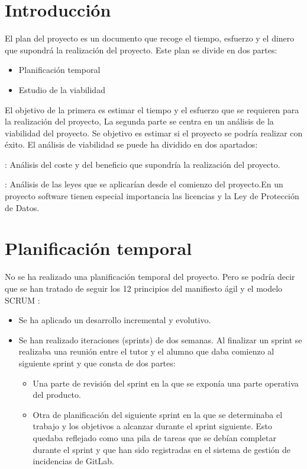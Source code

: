 
\section{Introducción}
El plan del proyecto es un documento que recoge el tiempo, esfuerzo y el dinero que supondrá la realización del proyecto.
Este plan se divide en dos partes:
\begin{itemize}
	\tightlist
	\item Planificación temporal
	\item Estudio de la viabilidad
\end{itemize}
El objetivo de la primera es estimar el tiempo y el esfuerzo que se requieren para la realización del proyecto, 
La segunda parte se centra en un análisis de la viabilidad del proyecto. Se objetivo es estimar si el proyecto se podría realizar con éxito. El análisis de viabilidad se puede ha dividido en dos apartados:
\begin{description}
	\tightlist
	\item[Viabilidad económica]: Análisis del coste y del beneficio que supondría la realización del proyecto.
	\item[Viabilidad legal]: Análisis de las leyes que se aplicarían desde el comienzo del proyecto.En un proyecto software tienen especial importancia las licencias y la Ley
	de Protección de Datos.
\end{description}

\section{Planificación temporal}
No se ha realizado una planificación temporal del proyecto. Pero se podría decir que se han tratado de seguir los 12 principios del manifiesto ágil y el modelo SCRUM \cite{noauthor_scrum_2019}:
\begin{itemize}
	\tightlist
	\item Se ha aplicado un desarrollo incremental y evolutivo.
	\item Se han realizado iteraciones (sprints) de dos semanas. Al finalizar un sprint se realizaba una reunión entre el tutor y el alumno que daba comienzo al siguiente sprint y que consta de dos partes:
	\begin{itemize}
		\item Una parte de revisión del sprint en la que se exponía una parte operativa del producto.
		\item Otra de planificación del siguiente sprint en la que se determinaba el trabajo y los objetivos a alcanzar durante el sprint siguiente. Esto quedaba reflejado como una pila de tareas que se debían completar durante el sprint y que han sido registradas en el sistema de gestión de incidencias de GitLab.
	\end{itemize}
\end{itemize}

